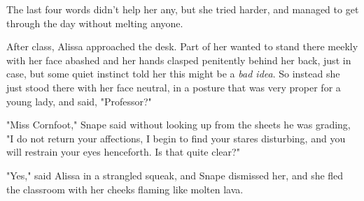 The last four words didn't help her any, but she tried harder, and managed to
get through the day without melting anyone.

After class, Alissa approached the desk. Part of her wanted to stand there
meekly with her face abashed and her hands clasped penitently behind her back,
just in case, but some quiet instinct told her this might be a \emph{bad idea}.
So instead she just stood there with her face neutral, in a posture that was
very proper for a young lady, and said, "Professor?"

"Miss Cornfoot," Snape said without looking up from the sheets he was grading,
"I do not return your affections, I begin to find your stares disturbing, and
you will restrain your eyes henceforth. Is that quite clear?"

"Yes," said Alissa in a strangled squeak, and Snape dismissed her, and she fled
the classroom with her cheeks flaming like molten lava.
